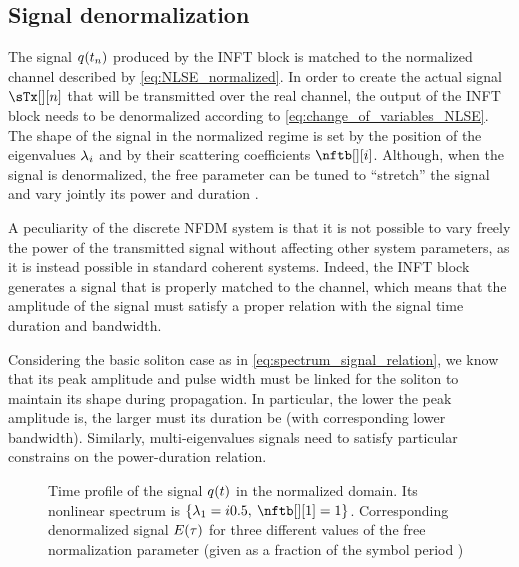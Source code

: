\subsection{Signal denormalization}\label{sec:nfdm_signal_denormalization}
The signal $\nflddig$ produced by the \ac{INFT} block is matched to the normalized channel
described by \eqref{eq:NLSE_normalized}. In order to create the actual signal $\sdTx$
that will be transmitted over the real channel, the output of the \ac{INFT} block needs
to be denormalized according to \eqref{eq:change_of_variables_NLSE}. The
shape of the signal in the normalized regime is set by the position of the
eigenvalues $\eig[i]$ and by their scattering coefficients $\nftb[][i]$. Although, when the signal
is denormalized, the free parameter \To{} can be tuned to ``stretch'' the
signal and vary jointly its power and duration \cite{gui2016phase}.

A peculiarity of the discrete \ac{NFDM} system is that it is not possible to vary
freely the power of the transmitted signal without affecting other system
parameters, as it is instead possible in standard coherent systems. Indeed, the
\ac{INFT} block generates a signal that is properly matched to the channel,
which means that the amplitude of the signal must satisfy a
proper relation with the signal time duration and bandwidth.

Considering the basic soliton case as in \eqref{eq:spectrum_signal_relation}, we
know that its peak amplitude and pulse width must be linked for the soliton to maintain its shape during propagation. In particular,
the lower the peak amplitude is, the larger must its duration be (with corresponding lower bandwidth).
Similarly, multi-eigenvalues signals need to satisfy particular constrains on
the power-duration relation.

\begin{figure}[t]
  \centering

  \caption{  Time profile of the signal $\nflds$ in the normalized domain. Its nonlinear spectrum is $\{\eig[1]=\iunit0.5,\:  \nftb[][1]=1\}$.  Corresponding denormalized signal $\fld(\ttm)$ for three different values of the free normalization parameter \To{} (given as a fraction of the symbol period \Ts{})}
  \label{fig:To_optimization}
\end{figure}

